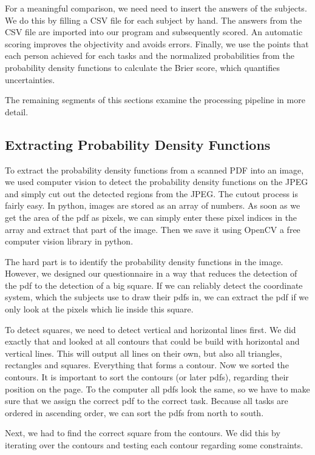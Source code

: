 \documentclass[../main/main.tex]{subfiles}
\begin{document}
	For a meaningful comparison, we need need to insert the answers of the subjects. We do this by filling a CSV file for each subject by hand. The answers from the CSV file are imported into our program and subsequently scored. An automatic scoring improves the objectivity and avoids errors. Finally, we use the points that each person achieved for each tasks and the normalized probabilities from the probability density functions to calculate the Brier score, which quantifies uncertainties.
	
	The remaining segments of this sections examine the processing pipeline in more detail.
	
	
	\subsection{Extracting Probability Density Functions}
	
	To extract the probability density functions from a scanned PDF into an image, we used computer vision to detect the probability density functions on the JPEG and simply cut out the detected regions from the JPEG. The cutout process is fairly easy. In python, images are stored as an array of numbers. As soon as we get the area of the pdf as pixels, we can simply enter these pixel indices in the array and extract that part of the image. Then we save it using OpenCV a free computer vision library in python.
	
	The hard part is to identify the probability density functions in the image. However, we designed our questionnaire in a way that reduces the detection of the pdf to the detection of a big square. If we can reliably detect the coordinate system, which the subjects use to draw their pdfs in, we can extract the pdf if we only look at the pixels which lie inside this square.
	
	To detect squares, we need to detect vertical and horizontal lines first. We did exactly that and looked at all contours that could be build with horizontal and vertical lines. This will output all lines on their own, but also all triangles, rectangles and squares. Everything that forms a contour. Now we sorted the contours. It is important to sort the contours (or later pdfs), regarding their position on the page. To the computer all pdfs look the same, so we have to make sure that we assign the correct pdf to the correct task. Because all tasks are ordered in ascending order, we can sort the pdfs from north to south.
	
	Next, we had to find the correct square from the contours. We did this by iterating over the contours and testing each contour regarding some constraints.
	
\end{document}
